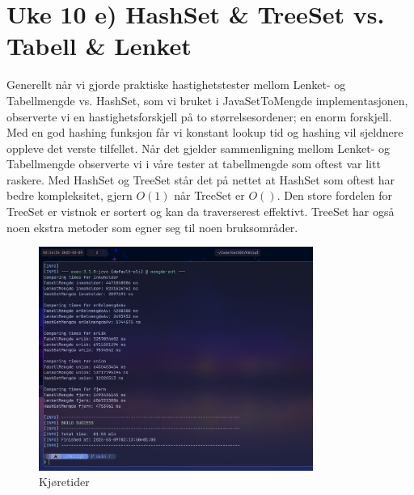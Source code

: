 \documentclass[12pt]{article}
\begin{document}
\section*{Uke 10 e) HashSet \& TreeSet vs. Tabell \& Lenket }
Generellt når vi gjorde praktiske hastighetstester mellom Lenket- og Tabellmengde 
vs. HashSet, som vi bruket i JavaSetToMengde implementasjonen, observerte vi 
en hastighetsforskjell på to størrelsesordener; en enorm forskjell. Med en god 
hashing funksjon får vi konstant lookup tid og hashing vil sjeldnere oppleve 
det verste tilfellet.
Når det gjelder sammenligning mellom Lenket- og Tabellmengde observerte vi i våre tester at 
tabellmengde som oftest var litt raskere. Med HashSet og TreeSet står det på nettet at 
HashSet som oftest har bedre kompleksitet, gjern \(O(1)\) når TreeSet er \(O()\).  
Den store fordelen for TreeSet er vistnok er sortert og kan da traverserest effektivt. 
TreeSet har også noen ekstra metoder som egner seg til noen bruksområder.

\begin{figure}[h]
    \centering
    \includegraphics[width=0.8\textwidth]{./EffektivitetsSammenligning.png} 
    \caption{Kjøretider}
    \label{fig:runtimes}
\end{figure}
\end{document}
